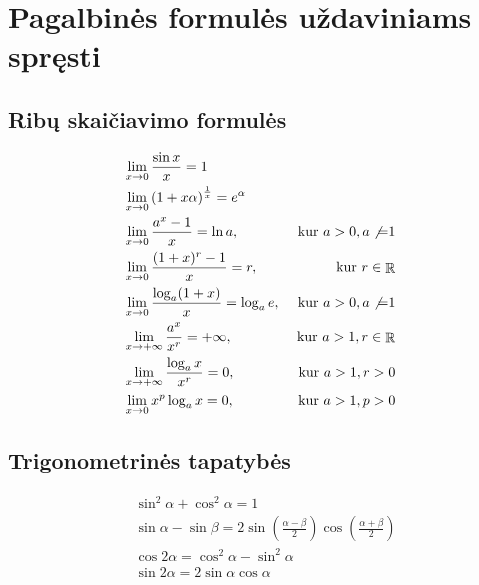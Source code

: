 \appendix
\chapter{Pagalbinės formulės uždaviniams spręsti}

\section{Ribų skaičiavimo formulės}

\begin{align} 
%
  &\lim _{x \to 0} \frac{\sin x}{x} = 1
  \label{f_lim_sin} \\
%
  &\lim _{x \to 0} \left( 1 + x \alpha \right)^{\frac{1}{x}} = e^{\alpha}
  \label{f_lim_exp} \\
%
  &\lim _{x \to 0} \frac{a^x - 1}{x} = \ln a, 
  & \text{ kur } a > 0, a \not{=}1
  \label{f_lim_ep} \\
% 
  &\lim _{x \to 0} \frac{(1 + x)^r -1}{x} = r, & \text{ kur } r \in \RSET
  \label{f_lim_lp} \\
%
  &\lim _{x \to 0} \frac{\log _{a} (1 + x)}{x} = \log _{a} e, 
  & \text{ kur } a > 0, a \not{=} 1
  \label{f_lim_log} \\
%
  &\lim _{x \to +\infty} \frac{a^x}{x^r} = +\infty, 
  & \text{ kur } a > 1, r \in \RSET
  \label{f_lim_rl} \\
% 
  &\lim _{x \to +\infty} \frac{\log _{a} x}{x^r} = 0,
  & \text{ kur } a > 1, r > 0
  \label{f_lim_llb} \\
%
  &\lim _{x \to 0} x^p \log _{a} x = 0, & \text{ kur } a > 1, p > 0
  \label{f_lim_lln}
%
\end{align}

\section{Trigonometrinės tapatybės}

\begin{align}
%
  & \sin ^{2} \alpha + \cos ^{2} \alpha = 1
  \label{f_tri_kvsum} \\
%
  & \sin \alpha - \sin \beta = 2 
    \sin \left( \frac{\alpha - \beta}{2} \right)
    \cos \left( \frac{\alpha + \beta}{2} \right)
  \label{f_tri_sinsk} \\
%
  & \cos 2 \alpha = \cos ^{2} \alpha - \sin ^{2} \alpha
  \label{f_tri_dkcos} \\
%
  & \sin 2 \alpha = 2 \sin \alpha \cos \alpha
  \label{f_tri_dksin} 
%
\end{align}
